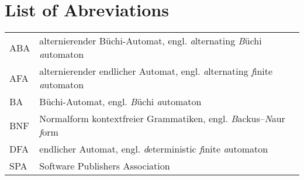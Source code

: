 
\cleardoublepage
{}
{}
\chapter*{List of Abreviations}
\label{section-abbrevs}

\begin{tabularx}{\textwidth}{lX}
  ABA & alternierender Büchi-Automat, engl. \emph{a}lternating \emph{B}üchi \emph{a}utomaton\\
  AFA & alternierender endlicher Automat, engl. \emph{a}lternating \emph{f}inite \emph{a}utomaton\\
  BA & Büchi-Automat, engl. \emph{B}üchi \emph{a}utomaton\\
  BNF & Normalform kontextfreier Grammatiken, engl. \emph{B}ackus--\emph{N}aur \emph{f}orm\\
  DFA & endlicher Automat, engl. \emph{d}eterministic \emph{f}inite \emph{a}utomaton\\
  SPA & Software Publishers Association
\end{tabularx}
